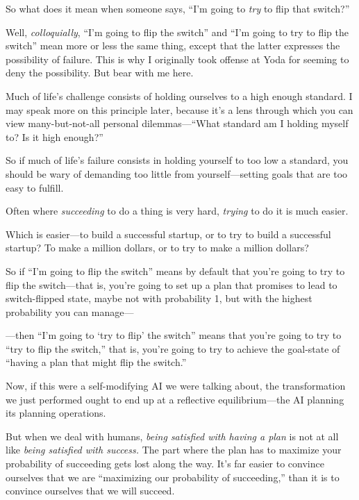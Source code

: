 {
 So what does it mean when someone says,
``I'm going to \textit{try} to flip
that switch?''}

{
 Well, \textit{colloquially},
``I'm going to flip the
switch'' and ``I'm
going to try to flip the switch'' mean more or less
the same thing, except that the latter expresses the possibility of
failure. This is why I originally took offense at Yoda for seeming to
deny the possibility. But bear with me here.}

{
 Much of life's challenge consists of holding
ourselves to a high enough standard. I may speak more on this principle
later, because it's a lens through which you can view
many-but-not-all personal dilemmas---``What standard
am I holding myself to? Is it high enough?''}

{
 So if much of life's failure consists in holding
yourself to too low a standard, you should be wary of demanding too
little from yourself---setting goals that are too easy to fulfill.}

{
 Often where \textit{succeeding} to do a thing is very hard,
\textit{trying} to do it is much easier.}

{
 Which is easier---to build a successful startup, or to try to
build a successful startup? To make a million dollars, or to try to
make a million dollars?}

{
 So if ``I'm going to flip the
switch'' means by default that you're
going to try to flip the switch---that is, you're going
to set up a plan that promises to lead to switch-flipped state, maybe
not with probability 1, but with the highest probability you can
manage---}

{
 {}---then ``I'm going to
`try to flip' the
switch'' means that you're going to
try to ``try to flip the switch,''
that is, you're going to try to achieve the goal-state
of ``having a plan that might flip the
switch.''}

{
 Now, if this were a self-modifying AI we were talking about, the
transformation we just performed ought to end up at a reflective
equilibrium---the AI planning its planning operations.}

{
 But when we deal with humans, \textit{being satisfied with having
a plan} is not at all like \textit{being satisfied with success.} The
part where the plan has to maximize your probability of succeeding gets
lost along the way. It's far easier to convince
ourselves that we are ``maximizing our probability of
succeeding,'' than it is to convince ourselves that
we will succeed.}

